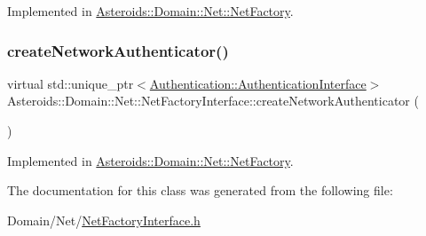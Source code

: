Implemented in \hyperlink{classAsteroids_1_1Domain_1_1Net_1_1NetFactory_ac7ae824eced4da33e4d79e4f219a67e1}{Asteroids\+::\+Domain\+::\+Net\+::\+Net\+Factory}.

\mbox{\label{classAsteroids_1_1Domain_1_1Net_1_1NetFactoryInterface_a933b03a4fcb601e4478409fdf5794168}} 
\subsubsection{\texorpdfstring{create\+Network\+Authenticator()}{createNetworkAuthenticator()}}
{\footnotesize\ttfamily virtual std\+::unique\+\_\+ptr$<$\hyperlink{classAsteroids_1_1Domain_1_1Net_1_1Authentication_1_1AuthenticationInterface}{Authentication\+::\+Authentication\+Interface}$>$ Asteroids\+::\+Domain\+::\+Net\+::\+Net\+Factory\+Interface\+::create\+Network\+Authenticator (\begin{DoxyParamCaption}{ }\end{DoxyParamCaption})\hspace{0.3cm}{\ttfamily [pure virtual]}}



Implemented in \hyperlink{classAsteroids_1_1Domain_1_1Net_1_1NetFactory_a2fafb49fb45db12d21f45d2753315225}{Asteroids\+::\+Domain\+::\+Net\+::\+Net\+Factory}.



The documentation for this class was generated from the following file\+:\begin{DoxyCompactItemize}
\item 
Domain/\+Net/\hyperlink{NetFactoryInterface_8h}{Net\+Factory\+Interface.\+h}\end{DoxyCompactItemize}
